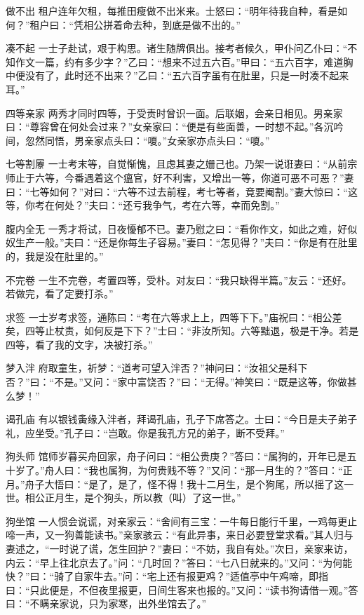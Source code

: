 \documentclass[12pt,UTF8]{ctexbook}
\begin{document}
做不出
租户连年欠租，每推田瘦做不出米来。士怒曰：“明年待我自种，看是如何？”租户曰：“凭相公拼着命去种，到底是做不出的。”

凑不起
一士子赴试，艰于构思。诸生随牌俱出。接考者候久，甲仆问乙仆曰：“不知作文一篇，约有多少字？”乙曰：“想来不过五六百。”甲曰：“五六百字，难道胸中便没有了，此时还不出来？”乙曰：“五六百字虽有在肚里，只是一时凑不起来耳。”

四等亲家
两秀才同时四等，于受责时曾识一面。后联姻，会亲日相见。男亲家曰：“尊容曾在何处会过来？”女亲家曰：“便是有些面善，一时想不起。”各沉吟间，忽然同悟，男亲家点头曰：“嗄。”女亲家亦点头曰：“嗄。”

七等割屪
一士考末等，自觉惭愧，且虑其妻之姗己也。乃架一说诳妻曰：“从前宗师止于六等，今番遇着这个瘟官，好不利害，又增出一等，你道可恶不可恶？”妻曰：“七等如何？”对曰：“六等不过去前程，考七等者，竟要阉割。”妻大惊曰：“这等，你考在何处？”夫曰：“还亏我争气，考在六等，幸而免割。”

腹内全无
一秀才将试，日夜懮郁不已。妻乃慰之曰：“看你作文，如此之难，好似奴生产一般。”夫曰：“还是你每生子容易。”妻曰：“怎见得？”夫曰：“你是有在肚里的，我是没在肚里的。”

不完卷
一生不完卷，考置四等，受朴。对友曰：“我只缺得半篇。”友云：“还好。若做完，看了定要打杀。”

求签
一士岁考求签，通陈曰：“考在六等求上上，四等下下。”庙祝曰：“相公差矣，四等止杖责，如何反是下下？”士曰：“非汝所知。六等黜退，极是干净。若是四等，看了我的文字，决被打杀。”

梦入泮
府取童生，祈梦：“道考可望入泮否？”神问曰：“汝祖父是科下否？”曰：“不是。”又问：“家中富饶否？”曰：“无得。”神笑曰：“既是这等，你做甚么梦！”

谒孔庙
有以银钱夤缘入泮者，拜谒孔庙，孔子下席答之。士曰：“今日是夫子弟子礼，应坐受。”孔子曰：“岂敢。你是我孔方兄的弟子，断不受拜。”

狗头师
馆师岁暮买舟回家，舟子问曰：“相公贵庚？”答曰：“属狗的，开年已是五十岁了。”舟人曰：“我也属狗，为何贵贱不等？”又问：“那一月生的？”答曰：“正月。”舟子大悟曰：“是了，是了，怪不得！我十二月生，是个狗尾，所以摇了这一世。相公正月生，是个狗头，所以教（叫）了这一世。”

狗坐馆
一人惯会说谎，对亲家云：“舍间有三宝：一牛每日能行千里，一鸡每更止啼一声，又一狗善能读书。”亲家骇云：“有此异事，来日必要登堂求看。”其人归与妻述之，“一时说了谎，怎生回护？”妻曰：“不妨，我自有处。”次日，亲家来访，内云：“早上往北京去了。”问：“几时回？”答曰：“七八日就来的。”又问：“为何能快？”曰：“骑了自家牛去。”问：“宅上还有报更鸡？”适值亭中午鸡啼，即指曰：“只此便是，不但夜里报更，日间生客来也报的。”又问：“读书狗请借一观。”答曰：“不瞒亲家说，只为家寒，出外坐馆去了。”
\end{document}
